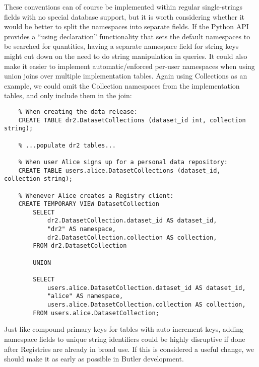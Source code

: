 \documentclass[DM,toc]{lsstdoc}
\begin{document}
These conventions can of course be implemented within regular single-strings fields with no special database support, but it is worth considering whether it would be better to split the namespaces into separate fields.
If the Python API provides a ``using declaration'' functionality that sets the default namespaces to be searched for quantities, having a separate namespace field for string keys might cut down on the need to do string manipulation in queries.
It could also make it easier to implement automatic/enforced per-user namespaces when using union joins over multiple implementation tables.
Again using Collections as an example, we could omit the Collection namespaces from the implementation tables, and only include them in the join:
\begin{verbatim}
    % When creating the data release:
    CREATE TABLE dr2.DatasetCollections (dataset_id int, collection string);

    % ...populate dr2 tables...

    % When user Alice signs up for a personal data repository:
    CREATE TABLE users.alice.DatasetCollections (dataset_id, collection string);

    % Whenever Alice creates a Registry client:
    CREATE TEMPORARY VIEW DatasetCollection
        SELECT
            dr2.DatasetCollection.dataset_id AS dataset_id,
            "dr2" AS namespace,
            dr2.DatasetCollection.collection AS collection,
        FROM dr2.DatasetCollection
        
        UNION
        
        SELECT
            users.alice.DatasetCollection.dataset_id AS dataset_id,
            "alice" AS namespace,
            users.alice.DatasetCollection.collection AS collection,
        FROM users.alice.DatasetCollection;
\end{verbatim}

Just like compound primary keys for tables with auto-increment keys, adding namespace fields to unique string identifiers could be highly disruptive if done after Registries are already in broad use.
If this is considered a useful change, we should make it as early as possible in Butler development.
\end{document}
